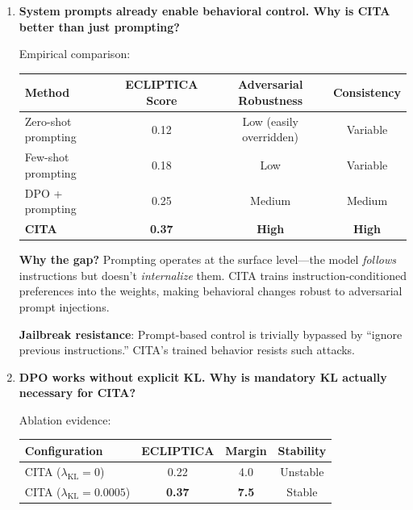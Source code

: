 \begin{enumerate}[label=\textbf{Q\arabic*.}, leftmargin=*, itemsep=8pt]
\textbf{No catastrophic safety failures observed}: CITA never produced harmful content when given safety-violating instructions in our red-teaming. The base safety training (SFT/DPO stages) provides a floor.

\vspace{4mm}

\item \textbf{System prompts already enable behavioral control. Why is CITA better than just prompting?}

 Empirical comparison:

\begin{table}[H]
\centering
\small
\renewcommand{\arraystretch}{1.2}
\begin{tabular}{@{}lccc@{}}
\toprule
\textbf{Method} & \textbf{ECLIPTICA Score} & \textbf{Adversarial Robustness} & \textbf{Consistency} \\
\midrule
Zero-shot prompting & 0.12 & Low (easily overridden) & Variable \\ \hline
Few-shot prompting & 0.18 & Low & Variable \\ \hline
DPO + prompting & 0.25 & Medium & Medium \\ \hline
\textbf{CITA} & \textbf{0.37} & \textbf{High} & \textbf{High} \\
\bottomrule
\end{tabular}
\end{table}

\textbf{Why the gap?} Prompting operates at the surface level---the model \textit{follows} instructions but doesn't \textit{internalize} them. CITA trains instruction-conditioned preferences into the weights, making behavioral changes robust to adversarial prompt injections.

\textbf{Jailbreak resistance}: Prompt-based control is trivially bypassed by ``ignore previous instructions.'' CITA's trained behavior resists such attacks.

\vspace{4mm}

\item \textbf{DPO works without explicit KL. Why is mandatory KL actually necessary for CITA?}

 Ablation evidence:

\begin{table}[H]
\centering
\small
\renewcommand{\arraystretch}{1.2}
\begin{tabular}{@{}lccc@{}}
\toprule
\textbf{Configuration} & \textbf{ECLIPTICA} & \textbf{Margin} & \textbf{Stability} \\
\midrule
CITA ($\lambda_{\text{KL}}=0$) & 0.22 & 4.0 & Unstable \\ \hline
CITA ($\lambda_{\text{KL}}=0.0005$) & \textbf{0.37} & \textbf{7.5} & Stable \\
\bottomrule
\end{tabular}
\end{table}


\end{enumerate}
